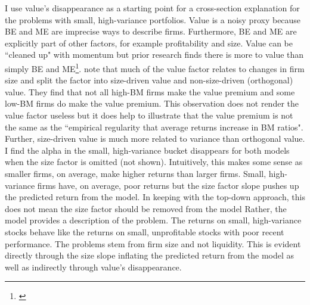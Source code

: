 I use value's disappearance as a starting point for a cross-section
explanation for the problems with small, high-variance portfolios.
Value is a noisy proxy because BE and ME are imprecise ways to describe firms.
Furthermore, BE and ME are explicitly part of other factors, for example
profitability and size.
Value can be ``cleaned up" with momentum but prior research finds there is more
to value than simply BE and ME\footnote{
\textcite{cohen2003value, daniel2006market, fama2008average}
}.
\textcite{gerakos2017decomposing} note that much of the value factor relates to
changes in firm size and split the factor into size-driven value and
non-size-driven (orthogonal) value.
They find that not all high-BM firms make the value
premium and some low-BM firms do make the value premium.
This observation does not render the value factor useless but it does help to
illustrate that the value premium is not the same as the ``empirical regularity
that average returns increase in BM ratios".
Further, size-driven value is much more related to variance than orthogonal
value.
I find the alpha in the small, high-variance bucket disappears for both models
when the size factor is omitted (not shown).
Intuitively, this makes some sense as smaller firms, on average, make higher
returns than larger firms.
Small, high-variance firms have, on average, poor returns but the size factor
slope pushes up the predicted return from the model.
In keeping with the top-down approach,
this does not mean the size factor should be removed from the model
Rather, the model provides a description of the problem.
The returns on small, high-variance stocks behave like the returns on small,
unprofitable stocks with poor recent performance.
The problems stem from firm size and not liquidity.
This is evident directly through the size slope inflating the predicted return
from the model as well as indirectly through value's disappearance.
